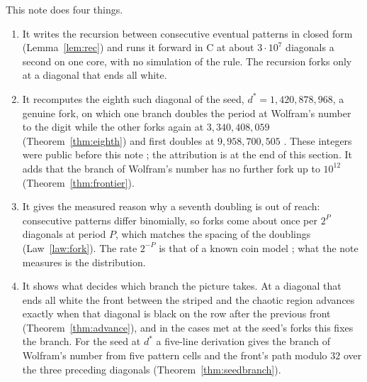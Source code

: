 \documentclass[11pt]{article}
\theoremstyle{definition}
\theoremstyle{remark}
\newcommand{\dstar}{d^{*}}
\begin{document}
This note does four things.
\begin{enumerate}[leftmargin=*,itemsep=1pt]
\item It writes the recursion between consecutive eventual patterns in closed form (Lemma~\ref{lem:rec}) and runs it forward in C at about $3\cdot10^7$ diagonals a second on one core, with no simulation of the rule. The recursion forks only at a diagonal that ends all white.
\item It recomputes the eighth such diagonal of the seed, $\dstar=1{,}420{,}878{,}968$, a genuine fork, on which one branch doubles the period at Wolfram's number to the digit while the other forks again at $3{,}340{,}408{,}059$ (Theorem~\ref{thm:eighth}) and first doubles at $9{,}958{,}700{,}505$ \cite{Pat}. These integers were public before this note \cite{Dib,Pat}; the attribution is at the end of this section. It adds that the branch of Wolfram's number has no further fork up to $10^{12}$ (Theorem~\ref{thm:frontier}).
\item It gives the measured reason why a seventh doubling is out of reach: consecutive patterns differ binomially, so forks come about once per $2^P$ diagonals at period $P$, which matches the spacing of the doublings (Law~\ref{law:fork}). The rate $2^{-P}$ is that of a known coin model \cite{Dib2,GG,Pat2}; what the note measures is the distribution.
\item It shows what decides which branch the picture takes. At a diagonal that ends all white the front between the striped and the chaotic region advances exactly when that diagonal is black on the row after the previous front (Theorem~\ref{thm:advance}), and in the cases met at the seed's forks this fixes the branch. For the seed at $\dstar$ a five-line derivation gives the branch of Wolfram's number from five pattern cells and the front's path modulo $32$ over the three preceding diagonals (Theorem~\ref{thm:seedbranch}).
\end{enumerate}
\end{document}
